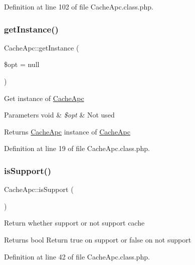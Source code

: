 Definition at line 102 of file Cache\+Apc.\+class.\+php.

\mbox{\label{classCacheApc_ab175f6bbdebb9ce327c019c3be313331}} 
\subsubsection{\texorpdfstring{get\+Instance()}{getInstance()}}
{\footnotesize\ttfamily Cache\+Apc\+::get\+Instance (\begin{DoxyParamCaption}\item[{}]{\$opt = {\ttfamily null} }\end{DoxyParamCaption})}

Get instance of \hyperlink{classCacheApc}{Cache\+Apc}


\begin{DoxyParams}[1]{Parameters}
void & {\em \$opt} & Not used \\
\hline
\end{DoxyParams}
\begin{DoxyReturn}{Returns}
\hyperlink{classCacheApc}{Cache\+Apc} instance of \hyperlink{classCacheApc}{Cache\+Apc} 
\end{DoxyReturn}


Definition at line 19 of file Cache\+Apc.\+class.\+php.

\mbox{\label{classCacheApc_abd38db973d6d7188606a726d7a5fcc40}} 
\subsubsection{\texorpdfstring{is\+Support()}{isSupport()}}
{\footnotesize\ttfamily Cache\+Apc\+::is\+Support (\begin{DoxyParamCaption}{ }\end{DoxyParamCaption})}

Return whether support or not support cache

\begin{DoxyReturn}{Returns}
bool Return true on support or false on not support 
\end{DoxyReturn}


Definition at line 42 of file Cache\+Apc.\+class.\+php.

